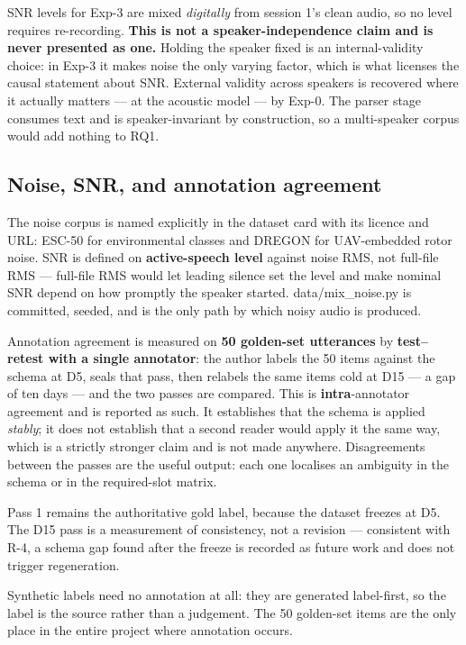 \documentclass[11pt,a4paper]{article}
\newcommand{\code}[1]{{\ttfamily\small #1}}
\begin{document}
SNR levels for Exp-3 are mixed \emph{digitally} from session 1's clean audio, so no level requires
re-recording. \textbf{This is not a speaker-independence claim and is never presented as one.} Holding the
speaker fixed is an internal-validity choice: in Exp-3 it makes noise the only varying factor, which is
what licenses the causal statement about SNR. External validity across speakers is recovered where it
actually matters --- at the acoustic model --- by Exp-0. The parser stage consumes text and is
speaker-invariant by construction, so a multi-speaker corpus would add nothing to RQ1.

\subsection{Noise, SNR, and annotation agreement}

The noise corpus is named explicitly in the dataset card with its licence and URL: ESC-50
\cite{esc50} for environmental classes and DREGON \cite{dregon} for UAV-embedded rotor noise. SNR is
defined on \textbf{active-speech level} against noise RMS, not full-file RMS --- full-file RMS would let
leading silence set the level and make nominal SNR depend on how promptly the speaker started.
\code{data/mix\_noise.py} is committed, seeded, and is the only path by which noisy audio is produced.

Annotation agreement is measured on \textbf{50 golden-set utterances} by \textbf{test--retest with a single
annotator}: the author labels the 50 items against the schema at D5, seals that pass, then relabels the
same items cold at D15 --- a gap of ten days --- and the two passes are compared. This is
\textbf{intra}-annotator agreement and is reported as such. It establishes that the schema is applied
\emph{stably}; it does not establish that a second reader would apply it the same way, which is a strictly
stronger claim and is not made anywhere. Disagreements between the passes are the useful output: each one
localises an ambiguity in the schema or in the required-slot matrix.

Pass 1 remains the authoritative gold label, because the dataset freezes at D5. The D15 pass is a
measurement of consistency, not a revision --- consistent with R-4, a schema gap found after the freeze is
recorded as future work and does not trigger regeneration.

Synthetic labels need no annotation at all: they are generated label-first, so the label is the source
rather than a judgement. The 50 golden-set items are the only place in the entire project where annotation
occurs.
\end{document}
